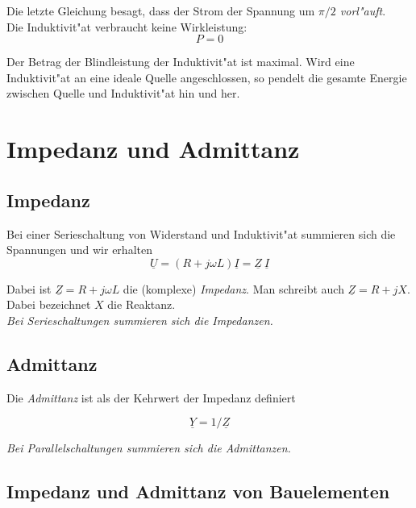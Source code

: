 \documentclass[german, 10pt, a4paper, headsepline]{scrreprt}
\theoremstyle{remark}
\begin{document}
Die letzte Gleichung besagt, dass der Strom der Spannung um \textit{$\pi/2$ vorl"auft}.\\

Die Induktivit"at verbraucht keine Wirkleistung:
\begin{displaymath}
	P = 0
\end{displaymath}

Der Betrag der Blindleistung der Induktivit"at ist maximal. Wird eine Induktivit"at an eine ideale Quelle angeschlossen, so pendelt die gesamte Energie zwischen Quelle und Induktivit"at hin und her.

\section{Impedanz und Admittanz}

\subsection{Impedanz}
Bei einer Serieschaltung von Widerstand und Induktivit"at summieren sich die Spannungen und wir erhalten
\begin{displaymath}
	\underline{U} = (R+j\omega L)\underline{I}=\underline{Z}\:\underline{I}
\end{displaymath}

Dabei ist $\underline{Z}=R+j\omega L$ die (komplexe) \textit{Impedanz}. Man schreibt auch $\underline{Z}=R+jX$. Dabei bezeichnet $X$ die Reaktanz.\\

\textit{Bei Serieschaltungen summieren sich die Impedanzen.}

\subsection{Admittanz}

Die \textit{Admittanz} ist als der Kehrwert der Impedanz definiert

\begin{displaymath}
	\underline{Y} = 1 /\underline{Z}
\end{displaymath}

\textit{Bei Parallelschaltungen summieren sich die Admittanzen.}


\subsection{Impedanz und Admittanz von Bauelementen}
\end{document}
